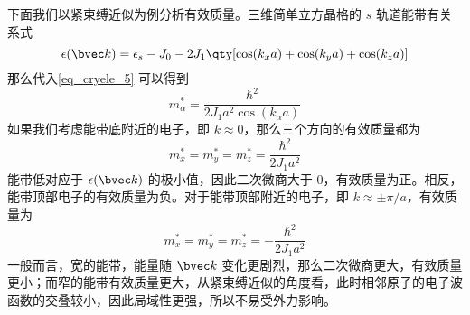 下面我们以紧束缚近似为例分析有效质量。三维简单立方晶格的 $s$ 轨道能带有关系式
\begin{equation}
\epsilon(\bvec k)=\epsilon_s-J_0-2J_1\qty[\cos(k_xa)+\cos(k_ya)+\cos(k_za)]
\end{equation}
那么代入\autoref{eq_cryele_5} 可以得到
\begin{equation}
m_\alpha^*=\frac{\hbar^2}{2 J_1 a^2\cos(k_\alpha a)}
\end{equation}
如果我们考虑能带底附近的电子，即 $k\approx 0$，那么三个方向的有效质量都为
\begin{equation}
m_x^*=m_y^*=m_z^*=\frac{\hbar^2}{2J_1a^2}
\end{equation}
能带低对应于 $\epsilon(\bvec k)$ 的极小值，因此二次微商大于 $0$，有效质量为正。相反，能带顶部电子的有效质量为负。对于能带顶部附近的电子，即 $k\approx \pm \pi/a$，有效质量为
\begin{equation}
m_x^*=m_y^*=m_z^*=-\frac{\hbar^2}{2J_1a^2}
\end{equation}
一般而言，宽的能带，能量随 $\bvec k$ 变化更剧烈，那么二次微商更大，有效质量更小；而窄的能带有效质量更大，从紧束缚近似的角度看，此时相邻原子的电子波函数的交叠较小，因此局域性更强，所以不易受外力影响。

